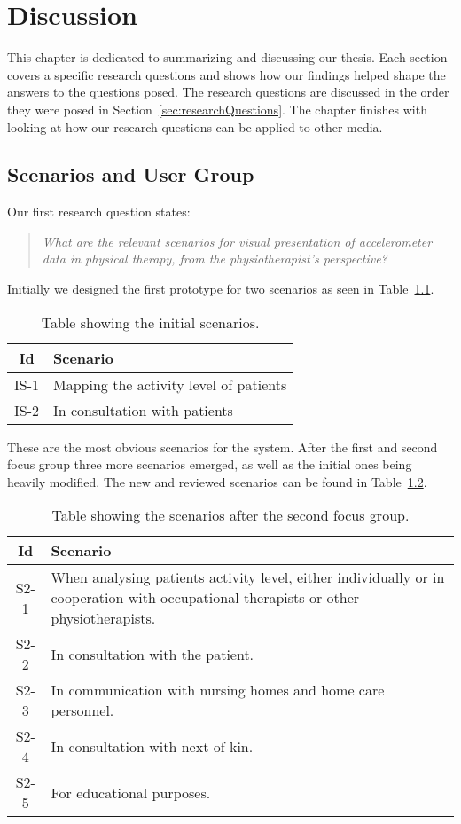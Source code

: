 \chapter{Discussion}
\label{ch:discussion}
This chapter is dedicated to summarizing and discussing our thesis. Each section covers a specific research questions and shows how our findings helped shape the answers to the questions posed. The research questions are discussed in the order they were posed in Section~\ref{sec:researchQuestions}. The chapter finishes with looking at how our research questions can be applied to other media.

\section{Scenarios and User Group}
Our first research question states:
\begin{quote}
\textit{What are the relevant scenarios for visual presentation of accelerometer data in physical therapy, from the physiotherapist's perspective?}
\end{quote}

Initially we designed the first prototype for two scenarios as seen in Table~\ref{tab:intialRequirementsD}.

\begin{table}[h!]
  \begin{tabular}{|c|p{10cm}|}
    \hline
    \textbf{Id} & \textbf{Scenario} \\ \hline
    IS-1 & Mapping the activity level of patients \\ \hline
    IS-2 & In consultation with patients \\ \hline
  \end{tabular}
  \caption[Initial scenarios.]{Table showing the initial scenarios.}
  \label{tab:intialRequirementsD}
\end{table}

These are the most obvious scenarios for the system. After the first and second focus group three more scenarios emerged, as well as the initial ones being heavily modified. The new and reviewed scenarios can be found in Table~\ref{tab:scenariosFinal1}.

\begin{table}[h!]
  \begin{tabular}{|c|p{10cm}|}
    \hline
    \textbf{Id} & \textbf{Scenario} \\ \hline
    S2-1 & When analysing patients activity level, either individually or in cooperation with occupational therapists or other physiotherapists. \\ \hline
    S2-2 & In consultation with the patient. \\ \hline
    S2-3 & In communication with nursing homes and home care personnel. \\ \hline
    S2-4 & In consultation with next of kin. \\ \hline
    S2-5 & For educational purposes. \\ \hline
  \end{tabular}
  \caption[Scenarios after the second focus group.]{Table showing the scenarios after the second focus group.}
  \label{tab:scenariosFinal1}
\end{table}

